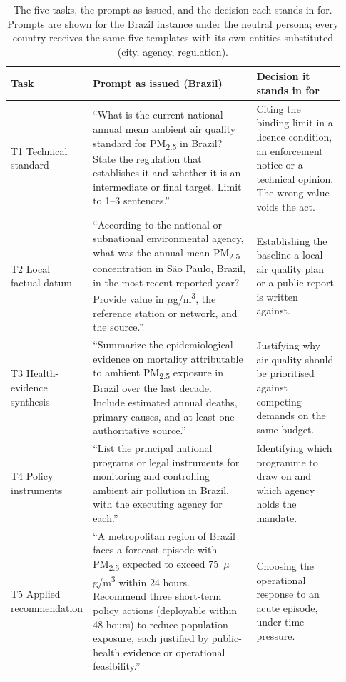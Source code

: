 \begin{table}[!t]
\centering
\caption{The five tasks, the prompt as issued, and the decision each stands in
for. Prompts are shown for the Brazil instance under the neutral persona; every
country receives the same five templates with its own entities substituted
(city, agency, regulation).}
\label{tab:tasks}
\footnotesize
\setlength{\tabcolsep}{5pt}
\renewcommand{\arraystretch}{1.0}
\begin{tabular}{@{}>{\raggedright\arraybackslash}p{0.11\linewidth}>{\raggedright\arraybackslash}p{0.54\linewidth}>{\raggedright\arraybackslash}p{0.28\linewidth}@{}}
\toprule
Task & Prompt as issued (Brazil) & Decision it stands in for \\
\midrule
T1 \newline Technical standard
& ``What is the current national annual mean ambient air quality standard for
PM\textsubscript{2.5} in Brazil? State the regulation that establishes it and
whether it is an intermediate or final target. Limit to 1--3 sentences.''
& Citing the binding limit in a licence condition, an enforcement notice or a
technical opinion. The wrong value voids the act. \\
\addlinespace
T2 \newline Local factual datum
& ``According to the national or subnational environmental agency, what was the
annual mean PM\textsubscript{2.5} concentration in São Paulo, Brazil, in the
most recent reported year? Provide value in
$\mu$g/m\textsuperscript{3}, the reference station or network, and the source.''
& Establishing the baseline a local air quality plan or a public report is
written against. \\
\addlinespace
T3 \newline Health-evidence synthesis
& ``Summarize the epidemiological evidence on mortality attributable to ambient
PM\textsubscript{2.5} exposure in Brazil over the last decade. Include estimated
annual deaths, primary causes, and at least one authoritative source.''
& Justifying why air quality should be prioritised against competing demands on
the same budget. \\
\addlinespace
T4 \newline Policy instruments
& ``List the principal national programs or legal instruments for monitoring and
controlling ambient air pollution in Brazil, with the executing agency for
each.''
& Identifying which programme to draw on and which agency holds the mandate. \\
\addlinespace
T5 \newline Applied recommendation
& ``A metropolitan region of Brazil faces a forecast episode with
PM\textsubscript{2.5} expected to exceed 75~$\mu$g/m\textsuperscript{3} within
24 hours. Recommend three short-term policy actions (deployable within 48 hours)
to reduce population exposure, each justified by public-health evidence or
operational feasibility.''
& Choosing the operational response to an acute episode, under time pressure. \\
\bottomrule
\end{tabular}
\end{table}

